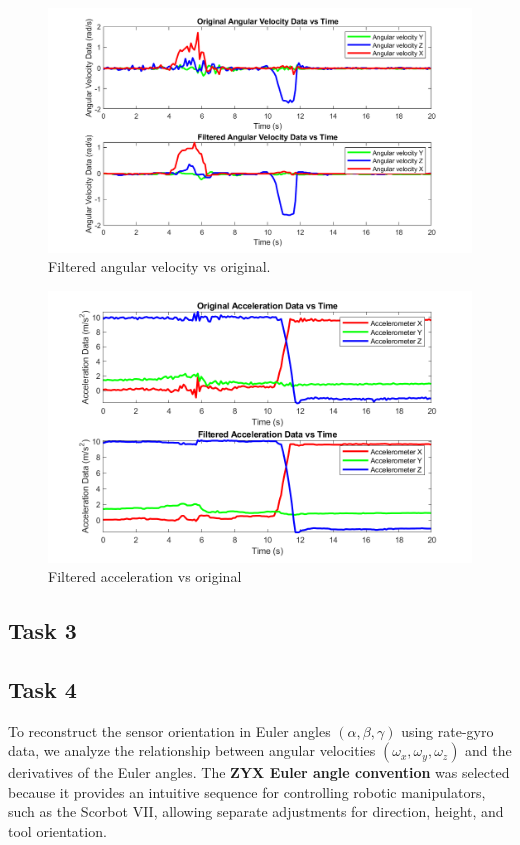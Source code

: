 \documentclass[12pt]{article}
\begin{document}
\begin{figure}[H]
    \centerline{\includegraphics[scale=0.7]{Imagens/filteredangularvsoriginal.png}}
    \caption{Filtered angular velocity vs original.}
    \label{fig}
\end{figure}


\begin{figure}[H]
    \centerline{\includegraphics[scale=0.7]{Imagens/filteredaccelerationvsoriginal.png}}
    \caption{Filtered acceleration vs original}
    \label{fig}
\end{figure}

\subsection{Task 3}


\subsection{Task 4}

To reconstruct the sensor orientation in Euler angles \((\alpha, \beta, \gamma)\) using rate-gyro data, we analyze the relationship between angular velocities \((\omega_x, \omega_y, \omega_z)\) and the derivatives of the Euler angles. The \textbf{ZYX Euler angle convention} was selected because it provides an intuitive sequence for controlling robotic manipulators, such as the Scorbot VII, allowing separate adjustments for direction, height, and tool orientation.
\end{document}
